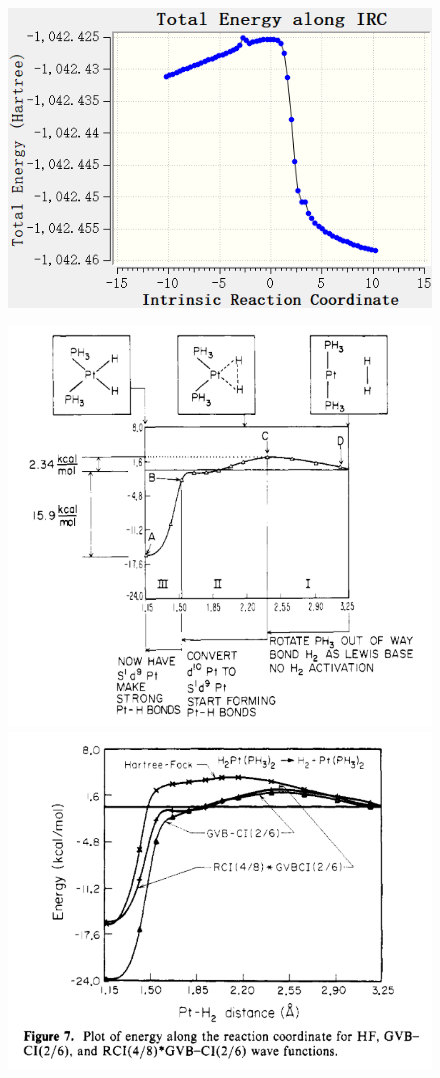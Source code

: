 \documentclass[10pt,aspectratio=43,mathserif]{beamer}
\begin{document}
\begin{frame}
\begin{figure}
	\includegraphics[width=0.45\linewidth]{../Pt/Pt_ircb2.png}
\end{figure}
\begin{figure}
	\includegraphics[width=0.45\linewidth]{god1.jpg}
	\includegraphics[width=0.45\linewidth]{god2.jpg}
\end{figure}
\end{frame}
\end{document}

